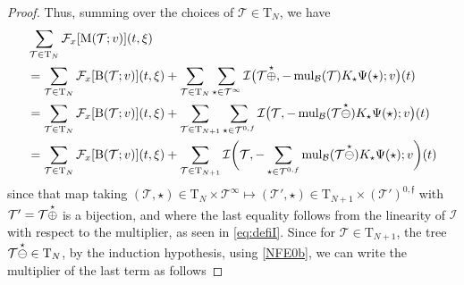 \documentclass[%
11pt,  reqno]{amsart}
\makeatletter
\newcommand{\5}{\textup{V}}
\newcommand{\noi}{\noindent}
\theoremstyle{remark}
\newcommand{\TT}{\mathcal{T}}
\newcommand{\Tr}{\mathrm{T}}
\newcommand{\Ft}{{\mathcal{F}}}
\newcommand{\ff}{\mathfrak{f}}
\DeclareMathOperator{\mulB}{mul_{\mathcal{B}}}
\def\<#1>{\csname MH@symb@#1\endcsname}
\newcommand{\Ical}{\mathcal{I}}
\numberwithin{equation}{section}
\numberwithin{theorem}{section}
\newcommand{\MM}{\mathrm{M}}
\newcommand{\BB}{\mathrm{B}}
\makeatother
\begin{document}
\begin{proof}
\noi
Thus, summing over the choices of $\TT \in \Tr_{N}$, we have
\begin{align}
\label{mul2a}
\begin{split}
&
\sum_{\TT\in \Tr_{N}} \Ft_x [\MM(\TT; v) ](t,\xi) 
\\
&
= \sum_{\TT\in \Tr_{N}} \Ft_x[\BB(\TT; v) ](t, \xi)  
+
\sum_{\TT\in \Tr_{N}}
\sum_{\star\in\TT^\infty}
\Ical 
\big(\TT \overset{\star}{\oplus} \<1>,
-\mulB(\TT) K_\star \Psi(\star);  v \big) (t)
\\
&
=
 \sum_{\TT\in \Tr_{N}} \Ft_x[\BB(\TT; v) ](t, \xi)  
+ \sum_{\TT\in
\Tr_{N+1}}\sum_{\star\in\TT^{0,f}}
\Ical 
\big(\TT,
-\mulB(\TT \overset{\star}{\ominus} \<1>) K_\star \Psi(\star); v \big) (t)
\\
&
= 
 \sum_{\TT\in \Tr_{N}} \Ft_x[\BB(\TT; v) ](t, \xi)  
+
\sum_{\TT\in \Tr_{N+1}}
\Ical 
\bigg(\TT,
-\sum_{\star\in\TT^{0,f}}
\mulB(\TT \overset{\star}{\ominus}  \<1> ) K_\star \Psi(\star) ;
v
\bigg) (t)
\end{split}
\end{align}
since that map taking $(\TT, \star) \in \Tr_N \times \TT^\infty \mapsto (\TT', \star) \in \Tr_{N+1} \times (\TT')^{0,\ff}$ with $\TT' = \TT \overset{\star}{\oplus} \<1>$ is a bijection, and  
where the last equality follows from the linearity of $\Ical$ with respect to the multiplier, as seen in \eqref{eq:defiI}. Since for $\TT\in \Tr_{N+1}$, the tree $\TT \overset{\star}{\ominus} \<1>\in \Tr_{N}$, by the induction hypothesis, using \eqref{NFE0b}, we can write the multiplier of the last term as follows


\end{proof}
\end{document}
